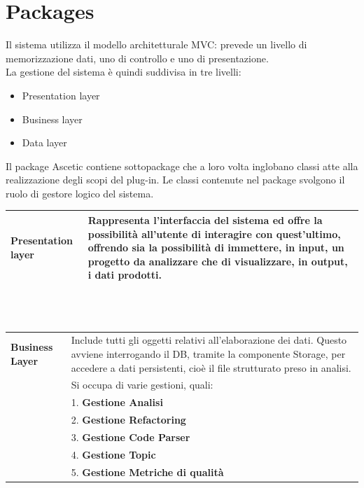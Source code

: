 \documentclass[11pt]{article}
\begin{document}
	\section{Packages}
	Il sistema utilizza il modello architetturale MVC: prevede un livello di memorizzazione dati,  uno di controllo e uno di presentazione.\\ La gestione del sistema è quindi suddivisa in tre livelli:
	\begin{itemize}
		\item Presentation layer
		\item Business layer
		\item Data layer
	\end{itemize}
	Il package Ascetic contiene sottopackage che a loro volta inglobano classi atte alla realizzazione degli scopi del plug-in. Le classi contenute nel package svolgono il ruolo di gestore logico del sistema.\newline \\
		
		\begin{tabular}{|p{3cm}|p{}|}
			\hline
			\textbf{Presentation layer} & Rappresenta l’interfaccia del sistema ed offre la possibilità all’utente di interagire con quest’ultimo, offrendo sia la possibilità di immettere, in input, un progetto da analizzare che di visualizzare, in output, i dati prodotti.\\
			\hline
		\end{tabular}
		\newline 
		\\ \\ 
		
		\begin{tabular}{|p{3cm}|p{}|}
			\hline
			\textbf{Business Layer} & Include tutti gli oggetti relativi all’elaborazione dei dati. Questo avviene interrogando il DB, tramite la componente Storage, per accedere a dati persistenti, cioè il file strutturato preso in analisi.\\
			& Si occupa di varie gestioni, quali:\\
			& 1. \textbf{Gestione Analisi} \\
			& 2. \textbf{Gestione Refactoring}\\
			& 3. \textbf{Gestione Code Parser}\\
			& 4. \textbf{Gestione Topic}\\
			& 5. \textbf{Gestione Metriche di qualità}\\
			\hline
		\end{tabular}
		\newline
		\\ \\
		
\end{document}
